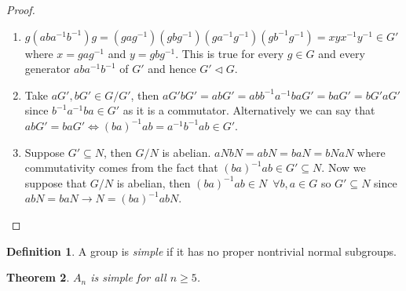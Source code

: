 \documentclass{article}
\newtheorem{theorem}{Theorem}[section]
\theoremstyle{definition}
\newtheorem{definition}[theorem]{Definition}
\begin{document}
\begin{proof}
    \begin{enumerate}
        \item $g(aba^{-1}b^{-1})g = (gag^{-1})(gbg^{-1})(ga^{-1}g^{-1}) (gb^{-1}g^{-1}) =xyx^{-1}y^{-1}\in G'$ where $x=gag^{-1}$ and $y=gbg^{-1}$. This is true for every $g\in G$ and every generator $aba^{-1}b^{-1}$ of $G'$ and hence $G' \lhd G$.
        \item Take $aG',bG' \in G/G'$, then $aG'bG' =abG' =abb^{-1}a^{-1}baG' = baG' =bG'aG'$ since $b^{-1}a^{-1}ba \in G'$ as it is a commutator. Alternatively we can say that $abG' = baG' \Leftrightarrow (ba)^{-1}ab = a^{-1}b^{-1}ab \in G'$. 
        \item Suppose $G' \subseteq N$, then $G/N$ is abelian. $aNbN = abN = baN = bNaN$ where commutativity comes from the fact that $(ba)^{-1}ab \in G' \subseteq N$. Now we suppose that $G/N$ is abelian, then $(ba)^{-1}ab \in N \,\,\, \forall b,a \in G$ so $G' \subseteq N$ since $abN =baN \to N=(ba)^{-1}abN$.
    \end{enumerate}
\end{proof}
\begin{definition}
    A group is \emph{simple} if it has no proper nontrivial normal subgroups. 
\end{definition}
\begin{theorem}
    $A_n$ is simple for all $n\geq 5$.
\end{theorem}
\end{document}

